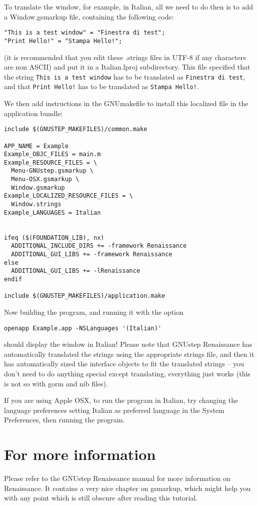 \documentclass[a4paper]{article}
\begin{document}
To translate the window, for example, in Italian, all we need to do
then is to add a Window.gsmarkup file, containing the following code:
\begin{verbatim}
"This is a test window" = "Finestra di test";
"Print Hello!" = "Stampa Hello!";
\end{verbatim}
(it is recommended that you edit these .strings files in UTF-8 if any
characters are non ASCII) and put it in a Italian.lproj subdirectory.
This file specified that the string \texttt{This is a test window} has
to be translated as \texttt{Finestra di test}, and that \texttt{Print
Hello!} has to be translated as \texttt{Stampa Hello!}.

We then add instructions in the GNUmakefile to install this localized
file in the application bundle:
\begin{verbatim}
include $(GNUSTEP_MAKEFILES)/common.make

APP_NAME = Example
Example_OBJC_FILES = main.m
Example_RESOURCE_FILES = \
  Menu-GNUstep.gsmarkup \
  Menu-OSX.gsmarkup \
  Window.gsmarkup
Example_LOCALIZED_RESOURCE_FILES = \
  Window.strings
Example_LANGUAGES = Italian


ifeq ($(FOUNDATION_LIB), nx)
  ADDITIONAL_INCLUDE_DIRS += -framework Renaissance
  ADDITIONAL_GUI_LIBS += -framework Renaissance
else
  ADDITIONAL_GUI_LIBS += -lRenaissance
endif

include $(GNUSTEP_MAKEFILES)/application.make
\end{verbatim}

Now building the program, and running it with the option
\begin{verbatim}
openapp Example.app -NSLanguages '(Italian)' 
\end{verbatim}
should display the window in Italian!  Please note that GNUstep
Renaissance has automatically translated the strings using the
appropriate strings file, and then it has automatically sized the
interface objects to fit the translated strings -- you don't need to
do anything special except translating, everything just works (this is
not so with gorm and nib files).

If you are using Apple OSX, to run the program in Italian, try
changing the language preferences setting Italian as preferred
language in the System Preferences, then running the program.

\section{For more information}
Please refer to the GNUstep Renaissance manual for more information on
Renaissance.  It contains a very nice chapter on gsmarkup, which might
help you with any point which is still obscure after reading this
tutorial.
\end{document}
